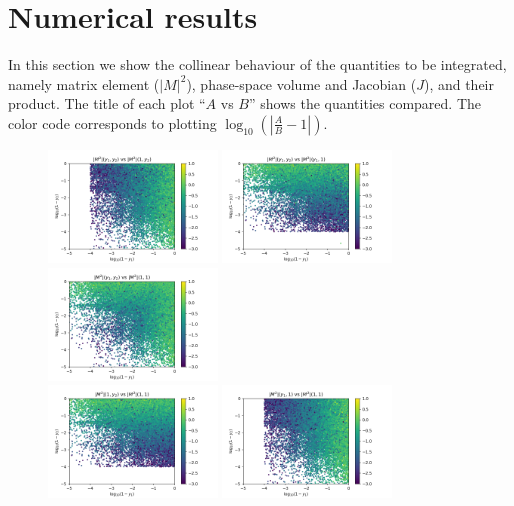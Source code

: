 \documentclass[a4paper,10pt]{article}
\begin{document}
\section{Numerical results}
In this section we show the collinear behaviour of the quantities to be integrated, namely matrix element ($|M|^2$), phase-space volume and Jacobian ($J$), and
their product. The title of each plot ``$A$ vs $B$'' shows the quantities compared. The color code corresponds to plotting $\log_{10} (|\frac{A}{B}-1|)$.
\begin{figure}
    \centering
    \includegraphics[width=0.4\textwidth, trim=0.2cm 0 1.8cm 0, clip]{figures/ratio_ME_0_1.png}
    \includegraphics[width=0.4\textwidth, trim=0.2cm 0 1.8cm 0, clip]{figures/ratio_ME_0_2.png}\\
    \includegraphics[width=0.4\textwidth, trim=0.2cm 0 1.8cm 0, clip]{figures/ratio_ME_0_3.png}\\
    \includegraphics[width=0.4\textwidth, trim=0.2cm 0 1.8cm 0, clip]{figures/ratio_ME_1_3.png}
    \includegraphics[width=0.4\textwidth, trim=0.2cm 0 1.8cm 0, clip]{figures/ratio_ME_2_3.png}
\end{figure}
\end{document}
